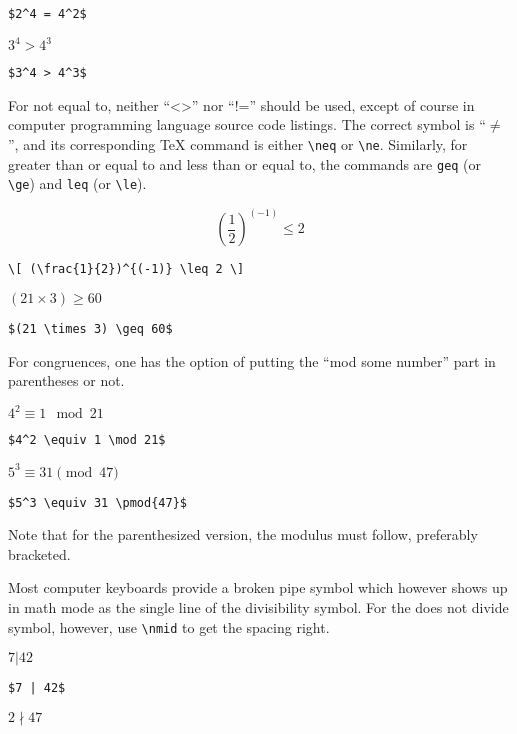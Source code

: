 \smallskip

\verb'$2^4 = 4^2$'

\medskip

$3^4 > 4^3$

\smallskip

\verb'$3^4 > 4^3$'

\bigskip

For not equal to, neither ``<>'' nor ``!='' should be used, except of course in computer programming language source code listings. The correct symbol is ``$\neq$'', and its corresponding \TeX{} command is either \verb=\neq= or \verb=\ne=. Similarly, for greater than or equal to and less than or equal to, the commands are \verb=geq= (or \verb=\ge=) and \verb=leq= (or \verb=\le=).

\[ \left(\frac{1}{2}\right)^{(-1)} \leq 2 \]

\verb'\[ (\frac{1}{2})^{(-1)} \leq 2 \]'

\medskip

$(21 \times 3) \geq 60$

\smallskip

\verb'$(21 \times 3) \geq 60$'

\bigskip

For congruences, one has the option of putting the ``mod some number'' part in parentheses or not.

\medskip

$4^2 \equiv 1 \mod 21$

\smallskip

\verb'$4^2 \equiv 1 \mod 21$'

\medskip

$5^3 \equiv 31 \pmod{47}$

\smallskip

\verb'$5^3 \equiv 31 \pmod{47}$'

\bigskip

Note that for the parenthesized version, the modulus must follow, preferably bracketed.

Most computer keyboards provide a broken pipe symbol which however shows up in math mode as the single line of the divisibility symbol. For the does not divide symbol, however, use \verb=\nmid= to get the spacing right.

\medskip

$7 | 42$

\smallskip

\verb'$7 | 42$'

\medskip

$2 \nmid 47$

